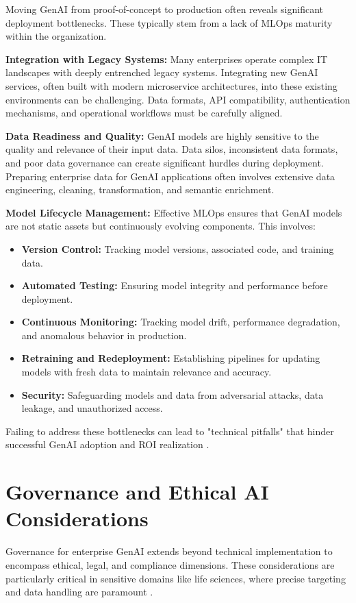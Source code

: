 \documentclass{article}
\begin{document}
Moving GenAI from proof-of-concept to production often reveals significant deployment bottlenecks. These typically stem from a lack of MLOps maturity within the organization.

\textbf{Integration with Legacy Systems:} Many enterprises operate complex IT landscapes with deeply entrenched legacy systems. Integrating new GenAI services, often built with modern microservice architectures, into these existing environments can be challenging. Data formats, API compatibility, authentication mechanisms, and operational workflows must be carefully aligned.

\textbf{Data Readiness and Quality:} GenAI models are highly sensitive to the quality and relevance of their input data. Data silos, inconsistent data formats, and poor data governance can create significant hurdles during deployment. Preparing enterprise data for GenAI applications often involves extensive data engineering, cleaning, transformation, and semantic enrichment.

\textbf{Model Lifecycle Management:} Effective MLOps ensures that GenAI models are not static assets but continuously evolving components. This involves:
\begin{itemize}
  \item \textbf{Version Control:} Tracking model versions, associated code, and training data.
  \item \textbf{Automated Testing:} Ensuring model integrity and performance before deployment.
  \item \textbf{Continuous Monitoring:} Tracking model drift, performance degradation, and anomalous behavior in production.
  \item \textbf{Retraining and Redeployment:} Establishing pipelines for updating models with fresh data to maintain relevance and accuracy.
  \item \textbf{Security:} Safeguarding models and data from adversarial attacks, data leakage, and unauthorized access.
\end{itemize}

Failing to address these bottlenecks can lead to "technical pitfalls" that hinder successful GenAI adoption and ROI realization \cite{openalex_w4400993506}.


\section{Governance and Ethical AI Considerations}


Governance for enterprise GenAI extends beyond technical implementation to encompass ethical, legal, and compliance dimensions. These considerations are particularly critical in sensitive domains like life sciences, where precise targeting and data handling are paramount \cite{crossref_10_2139_ssrn_6374778}.
\end{document}
